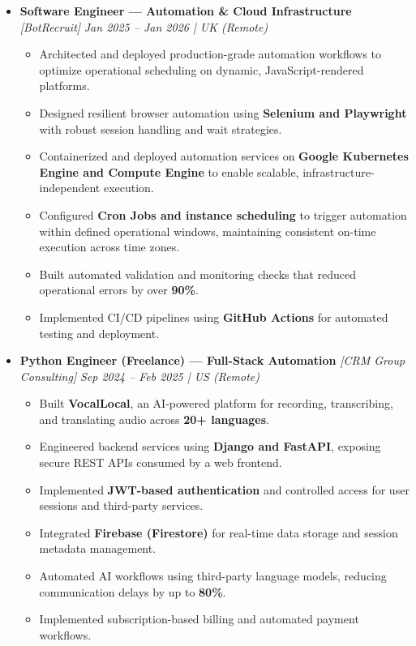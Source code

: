 \documentclass[a4paper,10pt]{article}
\begin{document}
\begin{itemize}

\item {\bf Software Engineer — Automation \& Cloud Infrastructure}
\textit{[BotRecruit]}
\textit{\hfill {Jan 2025 -- Jan 2026 | UK (Remote)}}
\begin{itemize}
\item Architected and deployed production-grade automation workflows
to optimize operational scheduling on dynamic, JavaScript-rendered platforms.
\item Designed resilient browser automation using
\textbf{Selenium and Playwright} with robust session handling and wait strategies.
\item Containerized and deployed automation services on
\textbf{Google Kubernetes Engine and Compute Engine}
to enable scalable, infrastructure-independent execution.
\item Configured \textbf{Cron Jobs and instance scheduling}
to trigger automation within defined operational windows,
maintaining consistent on-time execution across time zones.
\item Built automated validation and monitoring checks that reduced
operational errors by over \textbf{90\%}.
\item Implemented CI/CD pipelines using \textbf{GitHub Actions}
for automated testing and deployment.
\end{itemize}

\end{itemize}

\begin{itemize}

\item {\bf Python Engineer (Freelance) — Full-Stack Automation}
\textit{[CRM Group Consulting]}
\textit{\hfill {Sep 2024 -- Feb 2025 | US (Remote)}}
\begin{itemize}
\item Built \textbf{VocalLocal}, an AI-powered platform for recording,
transcribing, and translating audio across \textbf{20+ languages}.
\item Engineered backend services using \textbf{Django and FastAPI},
exposing secure REST APIs consumed by a web frontend.
\item Implemented \textbf{JWT-based authentication}
and controlled access for user sessions and third-party services.
\item Integrated \textbf{Firebase (Firestore)} for real-time data storage
and session metadata management.
\item Automated AI workflows using third-party language models,
reducing communication delays by up to \textbf{80\%}.
\item Implemented subscription-based billing and automated payment workflows.
\end{itemize}

\end{itemize}
\end{document}
